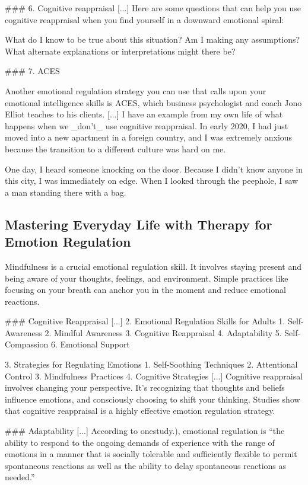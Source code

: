 \documentclass[12pt]{article}
\begin{document}
\#\#\# 6. Cognitive reappraisal [...] Here are some questions that can help you use cognitive reappraisal when you find yourself in a downward emotional spiral:

   What do I know to be true about this situation?
   Am I making any assumptions?
   What alternate explanations or interpretations might there be?

\#\#\# 7. ACES

Another emotional regulation strategy you can use that calls upon your emotional intelligence skills is ACES, which business psychologist and coach Jono Elliot teaches to his clients. [...] I have an example from my own life of what happens when we \_don’t\_ use cognitive reappraisal. In early 2020, I had just moved into a new apartment in a foreign country, and I was extremely anxious because the transition to a different culture was hard on me.

One day, I heard someone knocking on the door. Because I didn’t know anyone in this city, I was immediately on edge. When I looked through the peephole, I saw a man standing there with a bag.\subsection{Mastering Everyday Life with Therapy for Emotion Regulation}
Mindfulness is a crucial emotional regulation skill. It involves staying present and being aware of your thoughts, feelings, and environment. Simple practices like focusing on your breath can anchor you in the moment and reduce emotional reactions.

\#\#\# Cognitive Reappraisal [...] 2.   Emotional Regulation Skills for Adults 
    1.   Self-Awareness 
    2.   Mindful Awareness 
    3.   Cognitive Reappraisal 
    4.   Adaptability 
    5.   Self-Compassion 
    6.   Emotional Support 

3.   Strategies for Regulating Emotions 
    1.   Self-Soothing Techniques 
    2.   Attentional Control 
    3.   Mindfulness Practices 
    4.   Cognitive Strategies [...] Cognitive reappraisal involves changing your perspective. It’s recognizing that thoughts and beliefs influence emotions, and consciously choosing to shift your thinking. Studies show that cognitive reappraisal is a highly effective emotion regulation strategy.

\#\#\# Adaptability [...] According to onestudy.), emotional regulation is “the ability to respond to the ongoing demands of experience with the range of emotions in a manner that is socially tolerable and sufficiently flexible to permit spontaneous reactions as well as the ability to delay spontaneous reactions as needed.”
\end{document}
